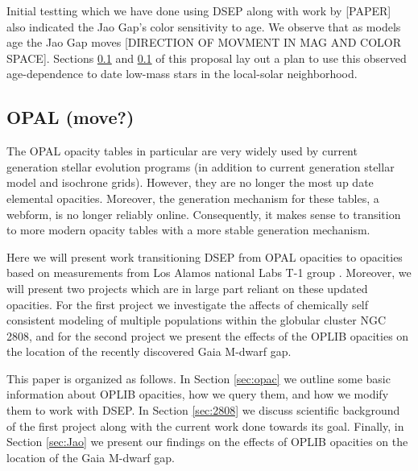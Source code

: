 Initial testting which we have done using DSEP along with work by [PAPER] also
indicated the Jao Gap's color sensitivity to age. We observe that as models age
the Jao Gap moves [DIRECTION OF MOVMENT IN MAG AND COLOR SPACE]. Sections \ref{}
and \ref{} of this proposal lay out a plan to use this observed age-dependence
to date low-mass stars in the local-solar neighborhood.

\subsection{OPAL (move?)}
The OPAL opacity tables in particular are very widely used by current
generation stellar evolution programs (in addition to current generation
stellar model and isochrone grids). However, they are no longer the most up
date elemental opacities. Moreover, the generation mechanism for these tables,
a webform, is no longer reliably online.  Consequently, it makes sense to
transition to more modern opacity tables with a more stable generation
mechanism.

Here we will present work transitioning DSEP from OPAL opacities to opacities
based on measurements from Los Alamos national Labs T-1 group
\citep[OPLIB][]{Colgan2016}. Moreover, we will present two projects which are
in large part reliant on these updated opacities. For the first project we
investigate the affects of chemically self consistent modeling of multiple
populations within the globular cluster NGC 2808, and for the second project we
present the effects of the OPLIB opacities on the location of the recently
discovered Gaia M-dwarf gap.

This paper is organized as follows. In Section \ref{sec:opac} we outline some
basic information about OPLIB opacities, how we query them, and how we modify
them to work with DSEP. In Section \ref{sec:2808} we discuss scientific
background of the first project along with the current work done towards its
goal. Finally, in Section \ref{sec:Jao} we present our findings on the effects
of OPLIB opacities on the location of the Gaia M-dwarf gap.





